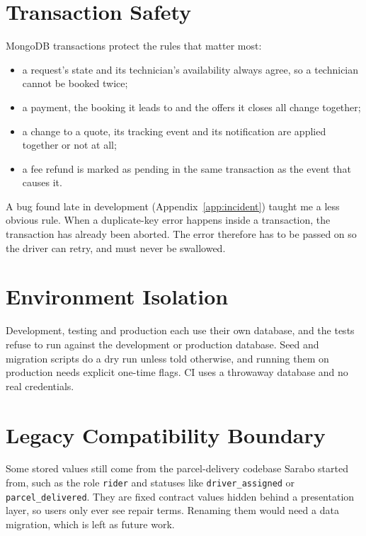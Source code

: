 \documentclass{standalone}
\begin{document}
\section{Transaction Safety}
MongoDB transactions protect the rules that matter most:
\begin{itemize}
  \item a request's state and its technician's availability always agree, so a technician cannot be booked twice;
  \item a payment, the booking it leads to and the offers it closes all change together;
  \item a change to a quote, its tracking event and its notification are applied together or not at all;
  \item a fee refund is marked as pending in the same transaction as the event that causes it.
\end{itemize}
A bug found late in development (Appendix~\ref{app:incident}) taught me a less obvious rule. When a duplicate-key error happens inside a transaction, the transaction has already been aborted. The error therefore has to be passed on so the driver can retry, and must never be swallowed.

\section{Environment Isolation}
Development, testing and production each use their own database, and the tests refuse to run against the development or production database. Seed and migration scripts do a dry run unless told otherwise, and running them on production needs explicit one-time flags. CI uses a throwaway database and no real credentials.

\section{Legacy Compatibility Boundary}
Some stored values still come from the parcel-delivery codebase Sarabo started from, such as the role \texttt{rider} and statuses like \texttt{driver\_assigned} or \texttt{parcel\_delivered}. They are fixed contract values hidden behind a presentation layer, so users only ever see repair terms. Renaming them would need a data migration, which is left as future work.
\end{document}
